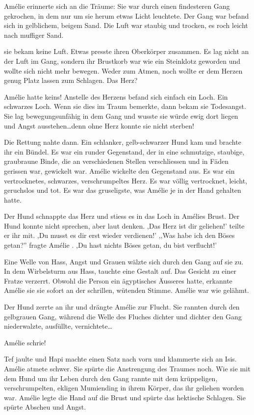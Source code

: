 \documentclass[11pt,titlepage,a5paper]{book}
\newcommand{\am}{Amélie }
\begin{document}
\am erinnerte sich an die Träume: Sie war durch einen findesteren Gang gekrochen, in dem nur um sie herum etwas Licht leuchtete. Der Gang war befand sich in gelblichem, beigem Sand. Die Luft war staubig und trocken, es roch leicht nach muffiger Sand.

sie bekam keine Luft. Etwas presste ihren Oberkörper zusammen. Es lag nicht an der Luft im Gang, sondern ihr Brustkorb war wie ein Steinklotz geworden und wollte sich nicht mehr bewegen. Weder zum Atmen, noch wollte er dem Herzen genug Platz lassen zum Schlagen. Das Herz? 

\am hatte keins! Anstelle des Herzens befand sich einfach ein Loch. Ein schwarzes Loch. Wenn sie dies im Traum bemerkte, dann bekam sie Todesangst. Sie lag bewegungsunfähig in dem Gang und wusste sie würde ewig dort liegen und Angst ausstehen\dots denn ohne Herz konnte sie nicht sterben!

Die Rettung nahte dann. Ein schlanker, gelb-schwarzer Hund kam und brachte ihr ein Bündel. Es war ein runder Gegenstand, der in eine schmutzige, staubige, graubraune Binde, die an verschiedenen Stellen verschliessen und in Fäden gerissen war, gewickelt war. \am wickelte den Gegenstand aus. Es war ein vertrocknetes, schwarzes, verschrumpeltes Herz. Es war völlig vertrocknet, leicht, geruchslos und tot. Es war das gruseligste, was \am je in der Hand gehalten hatte. 

 Der Hund schnappte das Herz und stiess es in das Loch in Amélies Brust. Der Hund konnte nicht sprechen, aber laut denken. ,Das Herz ist dir geliehen!' teilte er ihr mit. ,Du musst es dir erst wieder verdienen!' ,,Was habe ich den Böses getan?'' fragte \am . ,Du hast nichts Böses getan, du bist verflucht!'
 
 Eine Welle von Hass, Angst und Grauen wälzte sich durch den Gang auf sie zu. In dem Wirbelsturm aus Hass, tauchte eine Gestalt auf. Das Gesicht zu einer Fratze verzerrt. Obwohl die Person ein ägyptisches Äusseres hatte, erkannte \am sie sie sofort an der schrillen, wütenden Stimme. \am war wie gelähmt.
 
 Der Hund zerrte an ihr und drängte \am zur Flucht. Sie rannten durch den gelbgrauen Gang, während die Welle des Fluches dichter und dichter den Gang niederwalzte, ausfüllte, vernichtete\dots
 
\am schrie!

Tef jaulte und Hapi machte einen Satz nach vorn und klammerte sich an Isis. \am atmete schwer. Sie spürte die Anstrengung des Traumes noch. Wie sie mit dem Hund um ihr Leben durch den Gang rannte mit dem krüppeligen, verschrumpelten, ekligen Mumiending in ihrem Körper, das ihr geliehen worden war. \am legte die Hand auf die Brust und spürte das hektische Schlagen. Sie spürte Abscheu und Angst.
\end{document}
